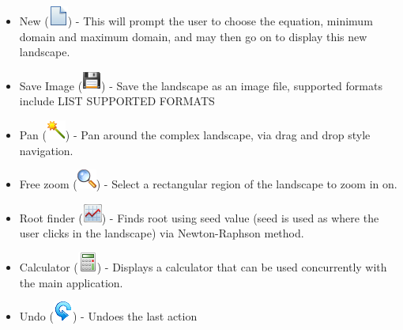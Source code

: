 \documentclass{article}
\begin{document}
				\begin{itemize}
					\item New (\includegraphics[height=\fontcharht\font`\B]{../src/resources/toolbar/new}) - This will prompt the user to choose the equation, minimum domain and maximum domain, and may then go on to display this new landscape.
					
					\item Save Image (\includegraphics[height=\fontcharht\font`\B]{../src/resources/toolbar/save}) - Save the landscape as an image file, supported formats include LIST SUPPORTED FORMATS
					
					\item Pan (\includegraphics[height=\fontcharht\font`\B]{../src/resources/toolbar/pan}) - Pan around the complex landscape, via drag and drop style navigation.
					
					\item Free zoom (\includegraphics[height=\fontcharht\font`\B]{../src/resources/toolbar/zoom}) - Select a rectangular region of the landscape to zoom in on.
					
					\item Root finder (\includegraphics[height=\fontcharht\font`\B]{../src/resources/toolbar/newton}) - Finds root using seed value (seed is used as where the user clicks in the landscape) via Newton-Raphson method.
					
					\item Calculator (\includegraphics[height=\fontcharht\font`\B]{../src/resources/toolbar/calculator}) - Displays a calculator that can be used concurrently with the main application.
					
					\item Undo (\includegraphics[height=\fontcharht\font`\B]{../src/resources/toolbar/undo}) - Undoes the last action
					

\end{itemize}
\end{document}

